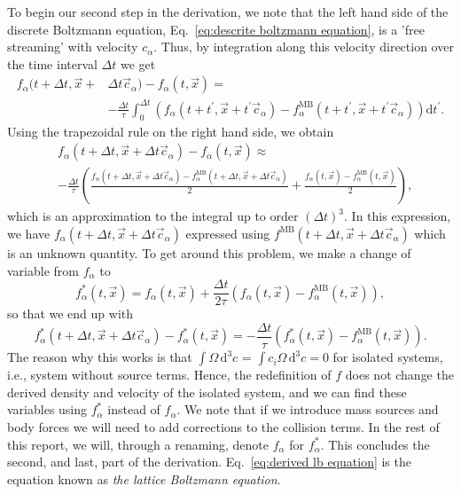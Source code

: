 \documentclass[11pt,a4paper]{report}
\begin{document}
To begin our second step in the derivation, we note that the left hand side of the discrete Boltzmann equation, Eq.~\eqref{eq:descrite boltzmann equation}, is a 'free streaming' with velocity $c_\alpha$. Thus, by integration along this velocity direction over the time interval $\Delta t$  we get
\begin{align*}
f_\alpha(t + \Delta t, \vec{x} + &\Delta t\vec{c}_\alpha) - f_\alpha(t, \vec{x}) =\\
 &-\frac{\Delta t}{\tau}\int_0^{\Delta t}\left(f_\alpha(t + t^\prime, \vec{x} + t^\prime\vec{c}_\alpha) - f^\mathrm{MB}_\alpha(t + t^\prime, \vec{x} + t^\prime\vec{c}_\alpha) \right)\mathrm{d}t^\prime.
\end{align*} 
Using the trapezoidal rule on the right hand side, we obtain
\begin{align*}
&f_\alpha(t + \Delta t, \vec{x} + \Delta t\vec{c}_\alpha) - f_\alpha(t, \vec{x}) \approx\\
&-\frac{\Delta t}{\tau}\left(\frac{f_\alpha(t + \Delta t, \vec{x} + \Delta t\vec{c}_\alpha)-f^\mathrm{MB}_\alpha(t + \Delta t, \vec{x} + \Delta t\vec{c}_\alpha)}{2} + \frac{f_\alpha(t, \vec{x})-f^\mathrm{MB}_\alpha(t, \vec{x})}{2}\right), 
\end{align*} 
which is an approximation to the integral up to order $(\Delta t)^3$. In this expression, we have $f_\alpha(t + \Delta t, \vec{x} + \Delta t\vec{c}_\alpha)$ expressed using $f^\mathrm{MB}(t + \Delta t, \vec{x} + \Delta t\vec{c}_\alpha)$ which is an unknown quantity. To get around this problem, we make a change of variable from $f_\alpha$ to
\begin{equation}
f^*_\alpha(t, \vec{x}) = f_\alpha(t, \vec{x}) + \frac{\Delta t}{2\tau}\left(f_\alpha(t, \vec{x})-f^\mathrm{MB}_\alpha(t, \vec{x})\right),
\end{equation}
so that we end up with
\begin{equation}\label{eq:derived lb equation}
f^*_\alpha(t + \Delta t, \vec{x} + \Delta t\vec{c}_\alpha) - f^*_\alpha(t, \vec{x}) = -\frac{\Delta t}{\tau}\left(f^*_\alpha(t, \vec{x}) - f^\mathrm{MB}_\alpha(t, \vec{x}) \right).
\end{equation}
The reason why this works is that $\int \Omega\,\mathrm{d}^3c$ = $\int c_i\Omega\,\mathrm{d}^3c = 0$ for isolated systems, i.e., system without source terms. Hence, the redefinition of $f$ does not change the derived density and velocity of the isolated system, and we can find these variables using $f^*_\alpha$ instead of $f_\alpha$. We note that if we introduce mass sources and body forces we will need to add corrections to the collision terms. In the rest of this report, we will, through a renaming, denote $f_\alpha$ for $f^*_\alpha$. This concludes the second, and last, part of the derivation. Eq.~\eqref{eq:derived lb equation} is the equation known as \textit{the lattice Boltzmann equation}.
\end{document}
